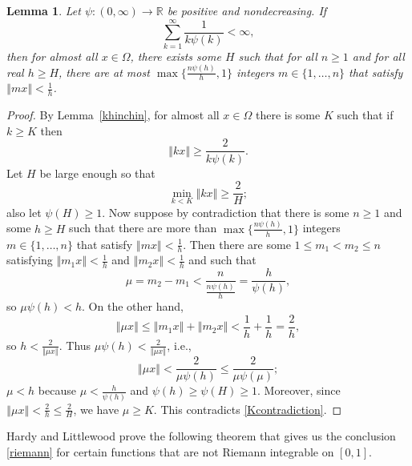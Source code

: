 \documentclass{article}
\newcommand{\norm}[1]{\left\Vert #1 \right\Vert}
\newtheorem{lemma}[theorem]{Lemma}
\begin{document}
\begin{lemma}
Let $\psi:(0,\infty) \to \mathbb{R}$ be positive and nondecreasing.
If 
\[
\sum_{k=1}^\infty \frac{1}{k\psi(k)}<\infty,
\]
then
for almost all $x \in \Omega$, there exists some $H$ such that for all $n \geq 1$ and for all real $h \geq H$, there are at most $\max\{\frac{n\psi(h)}{h},1\}$ integers $m \in \{1,\ldots,n\}$
that satisfy $\norm{mx} < \frac{1}{h}$.
\label{hllemma}
\end{lemma}
\begin{proof}
By Lemma~\ref{khinchin},
for almost all $x \in \Omega$ there is some $K$ such that if $k \geq K$ then
\begin{equation}
\norm{kx} \geq \frac{2}{k\psi(k)}.
\label{Kcontradiction}
\end{equation}
Let $H$ be  large enough  so that
\[
\min_{k < K} \norm{kx} \geq \frac{2}{H};
\]
also let $\psi(H) \geq 1$.
Now suppose by contradiction that there is some $n \geq 1$ and some $h \geq H$ such that there are more
than $\max\{\frac{n\psi(h)}{h},1\}$ integers $m \in \{1,\ldots,n\}$
that satisfy $\norm{mx} < \frac{1}{h}$.
Then there are some $1 \leq m_1 < m_2 \leq n$ satisfying $\norm{m_1 x}<\frac{1}{h}$ and $\norm{m_2 x}<
\frac{1}{h}$ and such that
\[
\mu=m_2-m_1< \frac{n}{\frac{n\psi(h)}{h}}=\frac{h}{\psi(h)},
\]
so $\mu \psi(h)<h$. 
On the other hand,
\[
\norm{\mu x} \leq \norm{m_1 x}+\norm{m_2 x}<\frac{1}{h}+\frac{1}{h}=\frac{2}{h},
\]
so $h<\frac{2}{\norm{\mu x}}$. Thus $\mu \psi(h)<\frac{2}{\norm{\mu x}}$, i.e.,
\[
\norm{\mu x}< \frac{2}{\mu \psi(h)} \leq \frac{2}{\mu \psi(\mu)};
\]
$\mu < h$ because $\mu<\frac{h}{\psi(h)}$ and $\psi(h) \geq \psi(H) \geq 1$.
Moreover, since $\norm{\mu x}<\frac{2}{h} \leq  \frac{2}{H}$, we have $\mu \geq K$. This contradicts \eqref{Kcontradiction}.
\end{proof}


Hardy and Littlewood \cite[p.~89, Theorem~4]{XXIV} prove the following theorem
that  gives us the conclusion \eqref{riemann} for certain functions that are not Riemann integrable on $[0,1]$.
\end{document}
